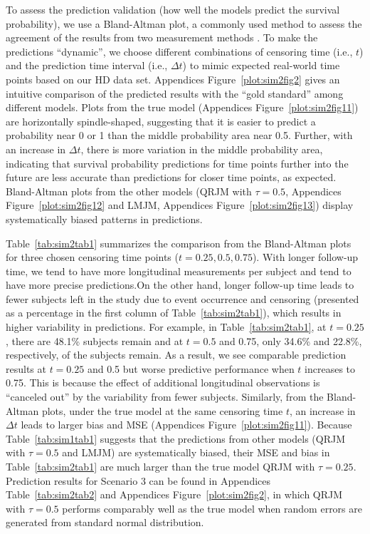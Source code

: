 To assess the prediction validation (how well the models predict the survival probability), we use a Bland-Altman plot, a commonly used method to assess the agreement of the results from two measurement methods \citep{bland1986statistical}. To make the predictions ``dynamic'', we choose different combinations of censoring time (i.e., $t$) and the prediction time interval (i.e., $\Delta t$) to mimic expected real-world time points based on our HD data set. Appendices Figure~\ref{plot:sim2fig2} gives an intuitive comparison of the predicted results with the ``gold standard'' among different models. Plots from the true model (Appendices Figure~\ref{plot:sim2fig11}) are horizontally spindle-shaped, suggesting that it is easier to predict a probability near 0 or 1 than the middle probability area near 0.5. Further, with an increase in $\Delta t$, there is more variation in the middle probability area, indicating that survival probability predictions for time points further into the future are less accurate than predictions for closer time points, as expected. Bland-Altman plots from the other models (QRJM with $\tau=0.5$, Appendices Figure~\ref{plot:sim2fig12} and LMJM, Appendices Figure~\ref{plot:sim2fig13}) display systematically biased patterns in predictions.

Table~\ref{tab:sim2tab1} summarizes the comparison from the Bland-Altman plots for three chosen censoring time points ($t=0.25, 0.5, 0.75$). With longer follow-up time, we tend to have more longitudinal measurements per subject and tend to have more precise predictions.On the other hand, longer follow-up time leads to fewer subjects left in the study due to event occurrence and censoring (presented as a percentage in the first column of Table~\ref{tab:sim2tab1}), which results in higher variability in predictions. For example, in Table~\ref{tab:sim2tab1}, at $t=0.25$, there are 48.1\% subjects remain and at $t=0.5$ and 0.75, only 34.6\% and 22.8\%, respectively, of the subjects remain. As a result, we see comparable prediction results at $t=0.25$ and 0.5 but worse predictive performance when $t$ increases to 0.75. This is because the effect of additional longitudinal observations is ``canceled out'' by the variability from fewer subjects. Similarly, from the Bland-Altman plots, under the true model at the same censoring time $t$, an increase in $\Delta t$ leads to larger bias and MSE (Appendices Figure~\ref{plot:sim2fig11}). Because Table~\ref{tab:sim1tab1} suggests that the predictions from other models (QRJM with $\tau=0.5$ and LMJM) are systematically biased, their MSE and bias in Table~\ref{tab:sim2tab1} are much larger than the true model QRJM with $\tau=0.25$. Prediction results for Scenario 3 can be found in Appendices Table~\ref{tab:sim2tab2} and Appendices Figure~\ref{plot:sim2fig2}, in which QRJM with $\tau = 0.5$ performs comparably well as the true model when random errors are generated from standard normal distribution.

